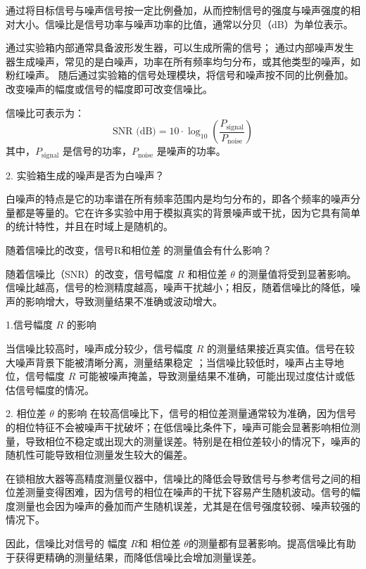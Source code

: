 \documentclass[dvipsnames, svgnames,a4paper,11pt]{article}
\begin{document}
		通过将目标信号与噪声信号按一定比例叠加，从而控制信号的强度与噪声强度的相对大小。信噪比是信号功率与噪声功率的比值，通常以分贝（dB）为单位表示。
        
		通过实验箱内部通常具备波形发生器，可以生成所需的信号；
		通过内部噪声发生器生成噪声，常见的是白噪声，功率在所有频率均匀分布，或其他类型的噪声，如粉红噪声。
		随后通过实验箱的信号处理模块，将信号和噪声按不同的比例叠加。改变噪声的幅度或信号的幅度即可改变信噪比。
		
		信噪比可表示为：
		\[
		\text{SNR (dB)} = 10 \cdot \log_{10} \left(\frac{P_{\text{signal}}}{P_{\text{noise}}}\right)
		\]
		其中，\( P_{\text{signal}} \) 是信号的功率，\( P_{\text{noise}} \) 是噪声的功率。

		2. 实验箱生成的噪声是否为白噪声？

		白噪声的特点是它的功率谱在所有频率范围内是均匀分布的，即各个频率的噪声分量都是等量的。它在许多实验中用于模拟真实的背景噪声或干扰，因为它具有简单的统计特性，并且在时域上是随机的。

		


	\begin{question}
		随着信噪比的改变，信号R和相位差的测量值会有什么影响？
	\end{question}
	随着信噪比（SNR）的改变，信号幅度 \( R \) 和相位差 \( \theta \) 的测量值将受到显著影响。信噪比越高，信号的检测精度越高，噪声干扰越小；相反，随着信噪比的降低，噪声的影响增大，导致测量结果不准确或波动增大。

	1.信号幅度 \( R \) 的影响
	
	当信噪比较高时，噪声成分较少，信号幅度 \( R \) 的测量结果接近真实值。信号在较大噪声背景下能被清晰分离，测量结果稳定
	；当信噪比较低时，噪声占主导地位，信号幅度 \( R \) 可能被噪声掩盖，导致测量结果不准确，可能出现过度估计或低估信号幅度的情况。

	 2. 相位差 \( \theta \) 的影响
	在较高信噪比下，信号的相位差测量通常较为准确，因为信号的相位特征不会被噪声干扰破坏；在低信噪比条件下，噪声可能会显著影响相位测量，导致相位不稳定或出现大的测量误差。特别是在相位差较小的情况下，噪声的随机性可能导致相位测量发生较大的偏差。
	
	在锁相放大器等高精度测量仪器中，信噪比的降低会导致信号与参考信号之间的相位差测量变得困难，因为信号的相位在噪声的干扰下容易产生随机波动。信号的幅度测量也会因为噪声的叠加而产生随机误差，尤其是在信号强度较弱、噪声较强的情况下。

	因此，信噪比对信号的 幅度 \( R \)和 相位差 \( \theta \)的测量都有显著影响。提高信噪比有助于获得更精确的测量结果，而降低信噪比会增加测量误差。
\end{document}
